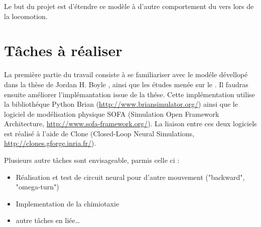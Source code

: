 Le but du projet est d'étendre ce modèle à d'autre comportement du vers lors de la locomotion.


\section{Tâches à réaliser} %
\label{sec:Tâches à réaliser}

La première partie du travail consiste à se familiariser avec le modéle dévellopé dans la thèse de Jordan
H. Boyle \cite{Boyle2009}, ainsi que les études menée sur le \celeg{}. Il faudras ensuite améliorer
l'implémantation issue de la thése. Cette implémentation utilise la bibliothéque Python Brian
(\url{http://www.briansimulator.org/}) ainsi que le logiciel de modélisation physique SOFA
(Simulation Open Framework Architecture, \url{http://www.sofa-framework.org/}). La liaison entre ces
deux logiciels est réalisé à l'aide de Clone (Closed-Loop Neural Simulations,
\url{http://clones.gforge.inria.fr/}).

Plusieurs autre tâches sont envisageable, parmis celle ci :
\begin{itemize}
   \item Réalisation et test de circuit neural pour d'autre mouvement ("backward", "omega-turn")
   \item Implementation de la chimiotaxie
   \item autre tâches en liée\dots
\end{itemize}




